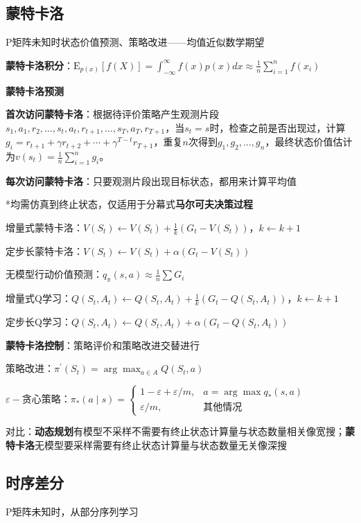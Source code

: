 	\subsection*{蒙特卡洛}
	P矩阵未知时状态价值预测、策略改进——均值近似数学期望
	
	\textbf{蒙特卡洛积分}：$\mathrm{E}_{p(x)}[f(X)]=\int_{-\infty}^{\infty} f(x)p(x)dx\approx\frac{1}{n}\sum_{i=1}^{n} f\left(x_{i}\right)$
	
	\textbf{蒙特卡洛预测}
	
	\textbf{首次访问蒙特卡洛}：根据待评价策略产生观测片段$s_{1},a_{1},r_{2},\ldots,s_{t},a_{t},r_{t+1},\ldots,s_{T},a_{T},r_{T+1}$，当$s_{t}=s$时，检查之前是否出现过，计算$g_{i}=r_{t+1}+\gamma r_{t+2}+\cdots+\gamma^{T-t}r_{T+1}$，重复$n$次得到$g_{1},g_{2},\ldots,g_{n}$，最终状态价值估计为$v(s_{t})=\frac{1}{n}\sum_{i=1}^{n}g_{i}$。
	
	\textbf{每次访问蒙特卡洛}：只要观测片段出现目标状态，都用来计算平均值
	
	*均需仿真到终止状态，仅适用于分幕式\textbf{马尔可夫决策过程}
	
	增量式蒙特卡洛：$V(S_{t})\leftarrow V(S_{t})+\frac{1}{k}(G_{t}-V(S_{t}))$，$k\leftarrow k+1$
	
	定步长蒙特卡洛：$V(S_{t})\leftarrow V(S_{t})+\alpha(G_{t}-V(S_{t}))$
	
	无模型行动价值预测：$q_{\pi}(s,a)\approx \frac{1}{n}\sum G_{i}$
	
	增量式Q学习：$Q(S_{t},A_{t})\leftarrow Q(S_{t},A_{t})+\frac{1}{k}(G_{t}-Q(S_{t},A_{t}))$，$k\leftarrow k+1$
	
	定步长Q学习：$Q(S_{t},A_{t})\leftarrow Q(S_{t},A_{t})+\alpha(G_{t}-Q(S_{t},A_{t}))$
	
	\textbf{蒙特卡洛控制}：策略评价和策略改进交替进行
	
	策略改进：$\pi^{\prime}(S_{t})=\arg\max_{a\in A}Q(S_{t},a)$
	
	$\varepsilon-$贪心策略：$\pi_{*}(a\mid s)=\begin{cases}1-\varepsilon+\varepsilon/m, & a=\arg\max q_{*}(s,a)\\ \varepsilon/m, & \text{其他情况}\end{cases}$
	
	对比：\textbf{动态规划}有模型不采样不需要有终止状态计算量与状态数量相关像宽搜；\textbf{蒙特卡洛}无模型要采样需要有终止状态计算量与状态数量无关像深搜
	
	\subsection*{时序差分}
	P矩阵未知时，从部分序列学习
	
